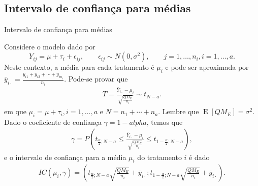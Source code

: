 \documentclass[8pt]{beamer}
\DeclareMathOperator{\espe}{E}
\begin{document}
\subsection{Intervalo de confiança para médias}

\begin{frame}{Intervalo de confiança para médias}

Considere o modelo dado por
$$Y_{ij} = \mu + \tau_i  + \epsilon_{ij}, \qquad \epsilon_{ij} \sim N(0, \sigma^2), \qquad j=1, \dots, n_i, i=1, \dots, a.$$
Neste contexto, a média para cada tratamento é $\mu_i$ e pode ser aproximada por $\bar{y}_{i\cdot} = \frac{y_{i1} + y_{i2} + \cdots + y_{in_i}}{n_i} $. Pode-se provar que
\begin{align*}
T = \frac{\bar{Y}_{i\cdot} - \mu_i}{\sqrt{\frac{QM_E}{n_i}}} \sim t_{N - a}.
\end{align*}
em que $\mu_i=\mu+\tau_i,i =1, \dots, a$ e $N = n_1 + \cdots + n_a$. Lembre que $\espe\left[QM_E\right] = \sigma^2$. Dado o coeficiente de confiança $\gamma=1-alpha$, temos que
\begin{align*}
\gamma = P\left( t_{\frac{\alpha}{2};N - a} \leq \frac{\bar{Y}_{i\cdot} - \mu_i}{\sqrt{\frac{QM_E}{n_i}}} \leq t_{1-\frac{\alpha}{2};N - a}  \right),
\end{align*}
e o intervalo de confiança para a média $\mu_i$ do tratamento  $i$ é dado
\begin{align*}
IC(\mu_i, \gamma) = \left( t_{\frac{\alpha}{2};N - a} \sqrt{\frac{QM_E}{n_i}} + \bar{y}_{i\cdot}; t_{1-\frac{\alpha}{2};N - a} \sqrt{\frac{QM_E}{n_i}} + \bar{y}_{i\cdot} \right).
\end{align*}
\end{frame}
\end{document}
